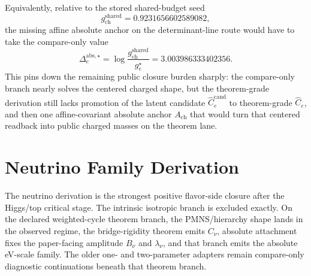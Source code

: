 \documentclass[11pt]{article}
\begin{document}
Equivalently, relative to the stored shared-budget seed
\[
g_{\mathrm{ch}}^{\mathrm{shared}} = 0.9231656602589082,
\]
the missing affine absolute anchor on the determinant-line route would have to take the compare-only value
\[
\Delta_e^{\mathrm{abs},\star}
=
\log\!\frac{g_{\mathrm{ch}}^{\mathrm{shared}}}{g_e^\star}
=
3.003986333402356.
\]
This pins down the remaining public closure burden sharply: the compare-only branch nearly solves
the centered charged shape, but the theorem-grade derivation still lacks promotion of the latent
candidate \(\widehat C_e^{\mathrm{cand}}\) to theorem-grade \(\widehat C_e\), and then one
affine-covariant absolute anchor \(A_{\mathrm{ch}}\) that would turn that centered readback into
public charged masses on the theorem lane.

\section{Neutrino Family Derivation}

The neutrino derivation is the strongest positive flavor-side closure after the Higgs/top
critical stage. The intrinsic isotropic branch is excluded exactly. On the declared
weighted-cycle theorem branch, the PMNS/hierarchy shape lands in the observed regime, the
bridge-rigidity theorem emits \(C_\nu\), absolute attachment fixes the paper-facing amplitude
\(B_\nu\) and \(\lambda_\nu\), and that branch emits the absolute eV-scale family. The older one- and two-parameter adapters
remain compare-only diagnostic continuations beneath that theorem branch.
\end{document}
